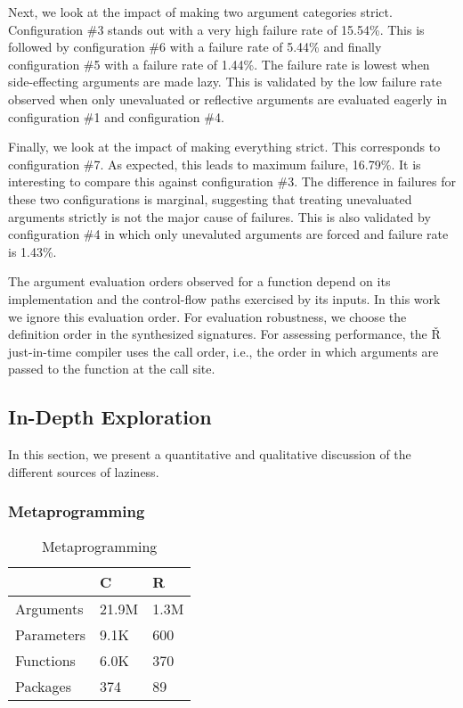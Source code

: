 \documentclass[review,nonacm,screen,acmsmall,anonymous=true]{acmart}
\newcommand{\authorcomment}[3]{}
\newcommand{\AG}[1]{\authorcomment{orange}{AG}{#1}}
\renewcommand{\Rsh}{{\sf\v R}\xspace}
\newcommand{\config}[1]{configuration \#{#1}}
\newcommand{\cconfig}[1]{Configuration \#{#1}}
\begin{document}
Next, we look at the impact of making two argument categories strict.
\cconfig{3} stands out with a very high failure rate of 15.54\%. This is
followed by \config{6} with a failure rate of 5.44\% and finally \config{5} with
a failure rate of 1.44\%. The failure rate is lowest when side-effecting
arguments are made lazy. This is validated by the low failure rate observed when
only unevaluated or reflective arguments are evaluated eagerly in \config{1} and
\config{4}.

Finally, we look at the impact of making everything strict. This corresponds to
\config{7}. As expected, this leads to maximum failure, 16.79\%. It is
interesting to compare this against \config{3}. The difference in failures for
these two configurations is marginal, suggesting that treating unevaluated
arguments strictly is not the major cause of failures. This is also validated by
\config{4} in which only unevaluted arguments are forced and failure rate is
1.43\%.


The argument evaluation orders observed for a function depend on its
implementation and the control-flow paths exercised by its inputs. In this work
we ignore this evaluation order. For evaluation robustness, we choose the
definition order in the synthesized signatures. For assessing performance, the
\Rsh just-in-time compiler uses the call order, i.e., the order in which
arguments are passed to the function at the call site.


\AG{Threats to validity: rlang has defiintion of SEXP.}


\subsection{In-Depth Exploration}\label{sec:lazr-discussion}

In this section, we present a quantitative and qualitative discussion of the
different sources of laziness.

\subsubsection{Metaprogramming}

\begin{wraptable}{r}{4cm}
  \vspace{-3mm}
  \small
  \caption{Metaprogramming} \label{table:meta}
  \centering
  \begin{tabular}{lll}
    \toprule
    &\textbf{C}&\textbf{R}\\
    \midrule
    Arguments&21.9M&1.3M\\
    Parameters&9.1K&600\\
    Functions&6.0K&370\\
    Packages&374&89\\
    \bottomrule
  \end{tabular}
\end{wraptable}
\end{document}
